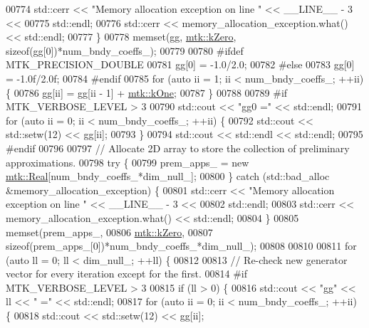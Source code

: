 \begin{DoxyCode}
{{00774     std::cerr << \textcolor{stringliteral}{"Memory allocation exception on line "} << \_\_LINE\_\_ - 3 <<
00775 std::endl;
00776     std::cerr << memory\_allocation\_exception.what() << std::endl;
00777   \}
00778   memset(gg, \hyperlink{group__c01-roots_ga59a451a5fae30d59649bcda274fea271}{mtk::kZero}, \textcolor{keyword}{sizeof}(gg[0])*num\_bndy\_coeffs\_);
00779 
00780 \textcolor{preprocessor}{  #ifdef MTK\_PRECISION\_DOUBLE}
00781   gg[0] = -1.0/2.0;
00782 \textcolor{preprocessor}{  #else}
00783   gg[0] = -1.0f/2.0f;
00784 \textcolor{preprocessor}{  #endif}
00785   \textcolor{keywordflow}{for} (\textcolor{keyword}{auto} ii = 1; ii < num\_bndy\_coeffs\_; ++ii) \{
00786     gg[ii] = gg[ii - 1] + \hyperlink{group__c01-roots_ga26407c24d43b6b95480943340d285c71}{mtk::kOne};
00787   \}
00788 
00789 \textcolor{preprocessor}{  #if MTK\_VERBOSE\_LEVEL > 3}
00790   std::cout << \textcolor{stringliteral}{"gg0 ="} << std::endl;
00791   \textcolor{keywordflow}{for} (\textcolor{keyword}{auto} ii = 0; ii < num\_bndy\_coeffs\_; ++ii) \{
00792     std::cout << std::setw(12) << gg[ii];
00793   \}
00794   std::cout << std::endl << std::endl;
00795 \textcolor{preprocessor}{  #endif}
00796 
00797   \textcolor{comment}{// Allocate 2D array to store the collection of preliminary approximations.}
00798   \textcolor{keywordflow}{try} \{
00799     prem\_apps\_ = \textcolor{keyword}{new} \hyperlink{group__c01-roots_gac080bbbf5cbb5502c9f00405f894857d}{mtk::Real}[num\_bndy\_coeffs\_*dim\_null\_];
00800   \} \textcolor{keywordflow}{catch} (std::bad\_alloc &memory\_allocation\_exception) \{
00801     std::cerr << \textcolor{stringliteral}{"Memory allocation exception on line "} << \_\_LINE\_\_ - 3 <<
00802       std::endl;
00803     std::cerr << memory\_allocation\_exception.what() << std::endl;
00804   \}
00805   memset(prem\_apps\_,
00806          \hyperlink{group__c01-roots_ga59a451a5fae30d59649bcda274fea271}{mtk::kZero},
00807          \textcolor{keyword}{sizeof}(prem\_apps\_[0])*num\_bndy\_coeffs\_*dim\_null\_);
00808 
00810 
00811   \textcolor{keywordflow}{for} (\textcolor{keyword}{auto} ll = 0; ll < dim\_null\_; ++ll) \{
00812 
00813     \textcolor{comment}{// Re-check new generator vector for every iteration except for the first.}
00814 \textcolor{preprocessor}{    #if MTK\_VERBOSE\_LEVEL > 3}
00815     \textcolor{keywordflow}{if} (ll > 0) \{
00816       std::cout << \textcolor{stringliteral}{"gg"} << ll << \textcolor{stringliteral}{" ="} << std::endl;
00817       \textcolor{keywordflow}{for} (\textcolor{keyword}{auto} ii = 0; ii < num\_bndy\_coeffs\_; ++ii) \{
00818         std::cout << std::setw(12) << gg[ii];
}}
\end{DoxyCode}
